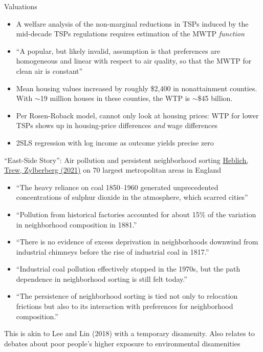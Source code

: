 \documentclass[11pt,notes=hide,aspectratio=169]{beamer}
\begin{document}
\begin{frame}{Valuations}
\begin{itemize}
\item A welfare analysis of the non-marginal reductions in TSPs induced by the mid-decade TSPs regulations requires estimation of the MWTP \textit{function}
\item ``A popular, but likely invalid, assumption is that preferences are homogeneous and linear with respect to air quality, so that the MWTP for clean air is constant''
\item Mean housing values increased by roughly \$2,400 in nonattainment counties. With $\sim$19 million houses in these counties, the WTP is $\sim$\$45 billion.
\item Per Rosen-Roback model, cannot only look at housing prices: WTP for lower TSPs shows up in housing-price differences \textit{and} wage differences
\item 2SLS regression with log income as outcome yields precise zero
\end{itemize}
\end{frame}
\begin{frame}{``East-Side Story'': Air pollution and persistent neighborhood sorting}
\href{https://doi.org/10.1086/713101}{Heblich, Trew, Zylberberg (2021)} on 70 largest metropolitan areas in England
\begin{itemize}
\item ``The heavy reliance on coal 1850--1960 generated unprecedented concentrations of sulphur dioxide in the atmosphere, which scarred cities''
\item ``Pollution from historical factories accounted for about 15\% of the variation in neighborhood composition in 1881.''
\item ``There is no evidence of excess deprivation in neighborhoods downwind from industrial chimneys before the rise of industrial coal in 1817.''
\item ``Industrial coal pollution effectively stopped in the 1970s, but the path dependence in neighborhood sorting is still felt today.''
\item ``The persistence of neighborhood sorting is tied not only to relocation frictions but also to its interaction with preferences for neighborhood composition.''
\end{itemize}
This is akin to Lee and Lin (2018) with a temporary disamenity.
Also relates to debates about poor people's higher exposure to environmental disamenities
\end{frame}
\end{document}
